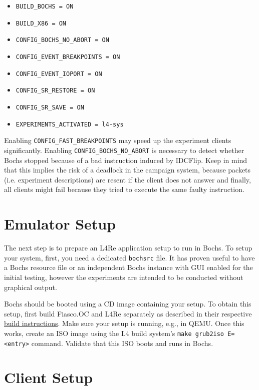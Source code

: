 \documentclass[a4paper,times,9pt]{article}
\begin{document}
\begin{itemize}[itemsep=0em]
\item \verb+BUILD_BOCHS = ON+
\item \verb+BUILD_X86 = ON+
\item \verb+CONFIG_BOCHS_NO_ABORT = ON+
\item \verb+CONFIG_EVENT_BREAKPOINTS = ON+
\item \verb+CONFIG_EVENT_IOPORT = ON+
\item \verb+CONFIG_SR_RESTORE = ON+
\item \verb+CONFIG_SR_SAVE = ON+
\item \verb+EXPERIMENTS_ACTIVATED = l4-sys+
\end{itemize}

Enabling \verb+CONFIG_FAST_BREAKPOINTS+ may speed up the experiment clients
significantly. Enabling \verb+CONFIG_BOCHS_NO_ABORT+ is necessary to detect
whether Bochs stopped because of a bad instruction induced by IDCFlip.
Keep in mind that this implies the risk of a deadlock
in the campaign system, because packets (i.e. experiment descriptions)
are resent if the client does not answer and finally, all clients
might fail because they tried to execute the same faulty instruction.

\section{Emulator Setup}

The next step is to prepare an L4Re application setup to run in Bochs.  To
setup your system, first, you need a dedicated \texttt{bochsrc} file.  It has
proven useful to have a Bochs resource file or an independent Bochs instance
with GUI enabled for the initial testing, however the experiments are intended
to be conducted without graphical output.

Bochs should be booted using a CD image containing your setup. To obtain this
setup, first build Fiasco.OC and L4Re separately as described in their
respective \href{https://os.inf.tu-dresden.de/L4Re/build.html}{build
instructions}. Make sure your setup is running, e.g., in QEMU. Once this
works, create an ISO image using the L4 build system's 
\verb+make grub2iso E=<entry>+ command. Validate that this ISO boots and runs
in Bochs.


\section{Client Setup}
\end{document}
